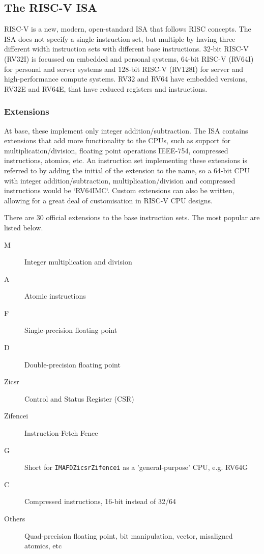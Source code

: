 \subsection{The RISC-V ISA}
RISC-V is a new, modern, open-standard ISA that follows RISC concepts. The ISA does not specify a single instruction set, but multiple by having three different width instruction sets with different base instructions. 32-bit RISC-V (RV32I) is focussed on embedded and personal systems, 64-bit RISC-V (RV64I) for personal and server systems and 128-bit RISC-V (RV128I) for server and high-performance compute systems. RV32 and RV64 have embedded versions, RV32E and RV64E, that have reduced registers and instructions.

\subsubsection{Extensions}
At base, these implement only integer addition/subtraction. The ISA contains extensions that add more functionality to the CPUs, such as support for multiplication/division, floating point operations IEEE-754, compressed instructions, atomics, etc. An instruction set implementing these extensions is referred to by adding the initial of the extension to the name, so a 64-bit CPU with integer addition/subtraction, multiplication/division and compressed instructions would be `RV64IMC`. Custom extensions can also be written, allowing for a great deal of customisation in RISC-V CPU designs.

There are 30 official extensions to the base instruction sets. The most popular are listed below.
\begin{description}
    \item[M] Integer multiplication and division
    \item[A] Atomic instructions
    \item[F] Single-precision floating point
    \item[D] Double-precision floating point
    \item[Zicsr] Control and Status Register (CSR)
    \item[Zifencei] Instruction-Fetch Fence
    \item[G] Short for \texttt{IMAFDZicsrZifencei} as a 'general-purpose' CPU, e.g. RV64G
    \item[C] Compressed instructions, 16-bit instead of 32/64
    \item[Others] Quad-precision floating point, bit manipulation, vector, misaligned atomics, etc
\end{description}

